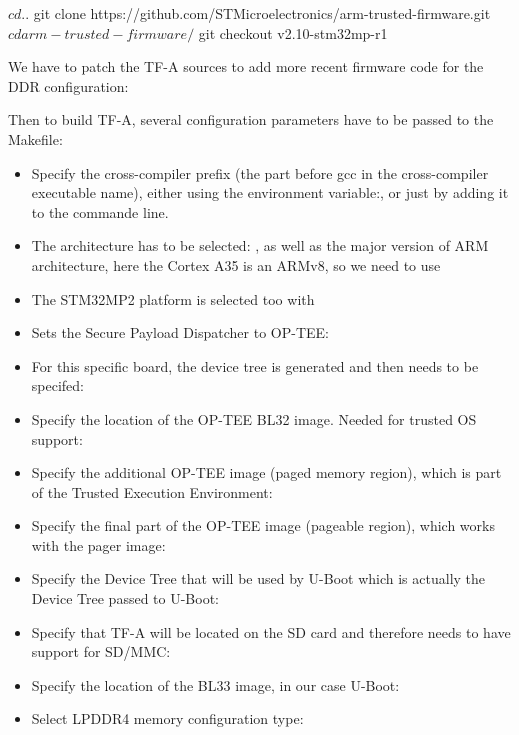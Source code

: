 \begin{bashinput}
$ cd ..
$ git clone https://github.com/STMicroelectronics/arm-trusted-firmware.git
$ cd arm-trusted-firmware/
$ git checkout v2.10-stm32mp-r1
\end{bashinput}

We have to patch the TF-A sources to add more recent firmware code for
the DDR configuration:


Then to build TF-A, several configuration parameters have to be passed
to the Makefile:

\begin{itemize}
\item Specify the cross-compiler prefix (the part before gcc in the
  cross-compiler executable name), either using the environment
  variable:, or just
  by adding it to the  commande line.
\item The architecture has to be selected: , as
  well as the major version of ARM architecture, here the Cortex A35
  is an ARMv8, so we need to use 
\item The STM32MP2 platform is selected too with 
\item Sets the Secure Payload Dispatcher to OP-TEE: 
\item For this specific board, the device tree is generated and then
  needs to be specifed: 
\item Specify the location of the OP-TEE BL32 image. Needed for
  trusted OS support:
\item Specify the additional OP-TEE image (paged memory region), which
  is part of the Trusted Execution Environment:
\item Specify the final part of the OP-TEE image (pageable region),
  which works with the pager image:
\item Specify the Device Tree that will be used by U-Boot which is
  actually the Device Tree passed to U-Boot:
\item Specify that TF-A will be located on the SD card and therefore
  needs to have support for SD/MMC: 
\item Specify the location of the BL33 image, in our case U-Boot:
\item Select LPDDR4 memory configuration type:
\end{itemize}

